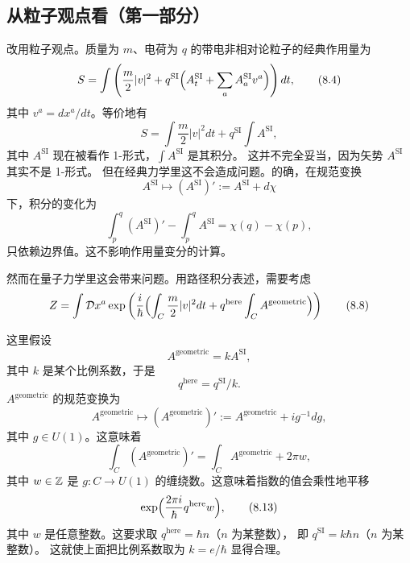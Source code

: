 \subsection{从粒子观点看（第一部分）}

改用粒子观点。质量为 $m$、电荷为 $q$ 的带电非相对论粒子的经典作用量为
\begin{equation}
S=\int\left(\frac m2|v|^2+q^{\text{SI}}\Bigl(A_t^{\text{SI}}
+\sum_aA_a^{\text{SI}}v^a\Bigr)\right)dt,
\tag{8.4}
\end{equation}
其中 $v^a=dx^a/dt$。等价地有
\begin{equation}
S=\int\frac m2|v|^2dt+q^{\text{SI}}\int A^{\text{SI}},
\tag{8.5}
\end{equation}
其中 $A^{\text{SI}}$ 现在被看作 1-形式，$\int A^{\text{SI}}$ 是其积分。
这并不完全妥当，因为矢势 $A^{\text{SI}}$ 其实不是 1-形式。
但在经典力学里这不会造成问题。的确，在规范变换
\begin{equation}
A^{\text{SI}}\mapsto(A^{\text{SI}})' :=A^{\text{SI}}+d\chi
\tag{8.6}
\end{equation}
下，积分的变化为
\begin{equation}
\int_p^q(A^{\text{SI}})'-\int_p^qA^{\text{SI}}=\chi(q)-\chi(p),
\tag{8.7}
\end{equation}
只依赖边界值。这不影响作用量变分的计算。

然而在量子力学里这会带来问题。用路径积分表述，需要考虑
\begin{equation}
Z=\int\mathcal{D}x^a\exp\left(\frac{i}{\hbar}
\Bigl(\int_C\frac m2|v|^2dt+q^{\text{here}}\int_CA^{\text{geometric}}\Bigr)\right)
\tag{8.8}
\end{equation}

这里假设
\begin{equation}
A^{\text{geometric}}=kA^{\text{SI}},
\tag{8.9}
\end{equation}
其中 $k$ 是某个比例系数，于是
\begin{equation}
q^{\text{here}}=q^{\text{SI}}/k.
\tag{8.10}
\end{equation}
$A^{\text{geometric}}$ 的规范变换为
\begin{equation}
A^{\text{geometric}}\mapsto(A^{\text{geometric}})' := A^{\text{geometric}}+ig^{-1}dg,
\tag{8.11}
\end{equation}
其中 $g\in U(1)$。这意味着
\begin{equation}
\int_C(A^{\text{geometric}})'=\int_CA^{\text{geometric}}+2\pi w,
\tag{8.12}
\end{equation}
其中 $w\in\mathbb{Z}$ 是 $g:C\to U(1)$ 的缠绕数。这意味着指数的值会乘性地平移
\begin{equation}
\exp\Bigl(\frac{2\pi i}{\hbar}q^{\text{here}}w\Bigr),
\tag{8.13}
\end{equation}
其中 $w$ 是任意整数。这要求取 $q^{\text{here}}=\hbar n$（$n$ 为某整数），
即 $q^{\text{SI}}=k\hbar n$（$n$ 为某整数）。
这就使上面把比例系数取为 $k=e/\hbar$ 显得合理。

